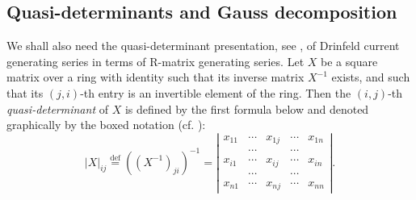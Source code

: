 \documentclass[11pt,reqno]{amsart}
\numberwithin{equation}{section}
\theoremstyle{definition}
\theoremstyle{remark}
\begin{document}
\subsection{Quasi-determinants and Gauss decomposition}
We shall also need the quasi-determinant presentation, see \cite{GGRW:2005}, of Drinfeld current generating series in terms of R-matrix generating series. Let $X$ be a square matrix over a ring with identity such that its inverse matrix $X^{-1}$ exists, 
and such that its $(j,i)$-th entry is an invertible element of the ring.  Then the $(i,j)$-th
\emph{quasi-determinant} of $X$ is defined by the first formula below and denoted graphically by the boxed notation (cf. \cite[\S1.10]{Mol07}):
\begin{equation*}
\vert X\vert _{ij} \stackrel{\text{def}}{=} \left((X^{-1})_{ji}\right)^{-1} = \left\vert  \begin{array}{ccccc} x_{11} & \cdots & x_{1j} & \cdots & x_{1n}\\
&\cdots & & \cdots&\\
x_{i1} &\cdots &\boxed{x_{ij}} & \cdots & x_{in}\\
& \cdots& &\cdots & \\
x_{n1} & \cdots & x_{nj}& \cdots & x_{nn}
\end{array} \right\vert .
\end{equation*}
\end{document}
